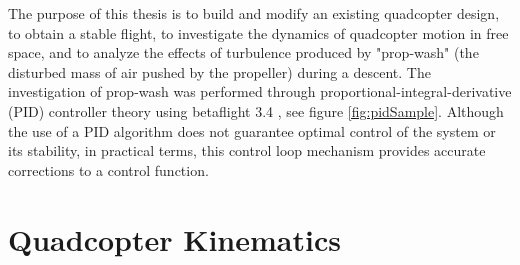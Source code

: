 \documentclass[11pt]{ucthesis}
\begin{document}
The purpose of this thesis is to build and modify an existing quadcopter design, to obtain a stable flight, to investigate the dynamics of quadcopter motion in free space, and to analyze the effects of turbulence produced by "prop-wash" (the disturbed mass of air pushed by the propeller) during a descent. The investigation of prop-wash was performed through proportional-integral-derivative (PID) controller theory using betaflight 3.4 \cite{Betaflight}, see figure \ref{fig:pidSample}. Although the use of a PID algorithm does not guarantee optimal control of the system or its stability, in practical terms, this control loop mechanism provides accurate corrections to a control function.
\newpage
\section{Quadcopter Kinematics}
\end{document}
